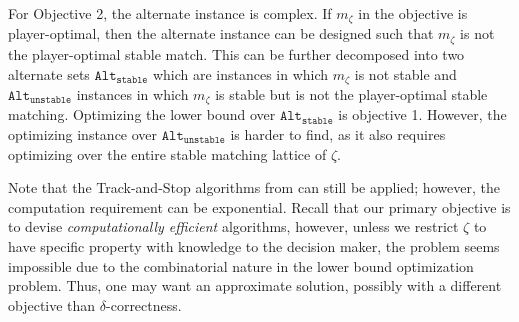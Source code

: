 \documentclass{article}
\newcommand{\stable}{\texttt{stable}}
\begin{document}
For Objective 2, the alternate instance is complex. If $m_{\zeta}$ in the objective is player-optimal, then the alternate instance can be designed such that $m_{\zeta}$ is not the player-optimal stable match. This can be further decomposed into two alternate sets $\texttt{Alt}_{\stable}$ which are instances in which $m_{\zeta}$ is not stable and $\texttt{Alt}_{\texttt{unstable}}$ instances in which $m_{\zeta}$ is stable but is not the player-optimal stable matching. Optimizing the lower bound over $\texttt{Alt}_{\stable}$ is objective 1. However, the optimizing instance over $\texttt{Alt}_{\texttt{unstable}}$ is harder to find, as it also requires optimizing over the entire stable matching lattice of $\zeta$.



Note that the Track-and-Stop algorithms from \cite{kaufmann2020contributions} can still be applied; however, the computation requirement can be exponential. 
Recall that our primary objective is to devise \textit{computationally efficient} algorithms, however, unless we restrict $\zeta$ to have specific property with knowledge to the decision maker, the problem seems impossible due to the combinatorial nature in the lower bound optimization problem. Thus, one may want an approximate solution, possibly with a different objective than $\delta$-correctness. 







\end{document}
